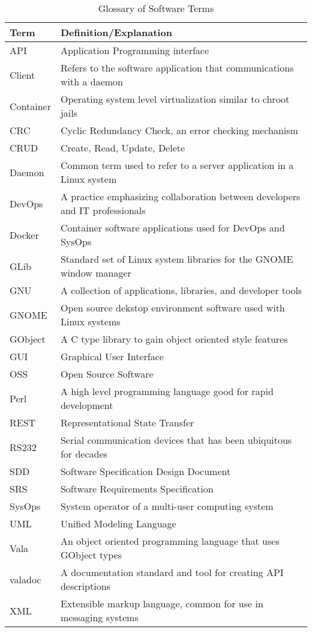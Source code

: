 \documentclass[11pt]{article}
\begin{document}
    \begin{table}[H]
      \centering
      \begin{tabular}{l p{12cm}}
        \toprule
        Term & Definition/Explanation \\ [0.5ex]
        \midrule
        API & Application Programming interface \\
        Client & Refers to the software application that communications with a daemon \\
        Container & Operating system level virtualization similar to chroot jails \\
        CRC & Cyclic Redundancy Check, an error checking mechanism \\
        CRUD & Create, Read, Update, Delete \\
        Daemon & Common term used to refer to a server application in a Linux system \\
        DevOps & A practice emphasizing collaboration between developers and IT professionals \\
        Docker & Container software applications used for DevOps and SysOps \\
        GLib & Standard set of Linux system libraries for the GNOME window manager \\
        GNU & A collection of applications, libraries, and developer tools \\
        GNOME & Open source dekstop environment software used with Linux systems \\
        GObject & A C type library to gain object oriented style features \\
        GUI & Graphical User Interface \\
        OSS & Open Source Software \\
        Perl & A high level programming language good for rapid development \\
        REST & Representational State Transfer \\
        RS232 & Serial communication devices that has been ubiquitous for decades \\
        SDD & Software Specification Design Document \\
        SRS & Software Requirements Specification \\
        SysOps & System operator of a multi-user computing system \\
        UML & Unified Modeling Language \\
        Vala & An object oriented programming language that uses GObject types \\
        valadoc & A documentation standard and tool for creating API descriptions \\
        XML & Extensible markup language, common for use in messaging systems \\
        \bottomrule
      \end{tabular}
      \caption{Glossary of Software Terms}\label{tab:gloss:sw}
    \end{table}
\end{document}
